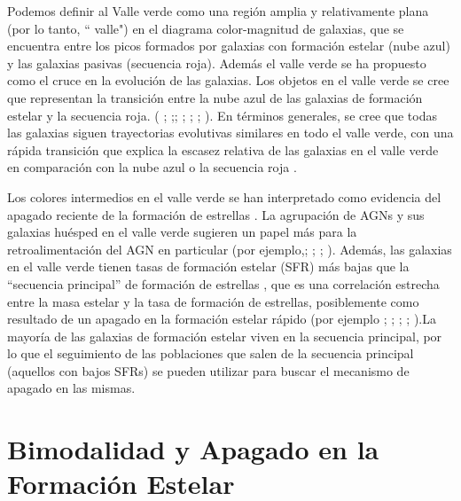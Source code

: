 Podemos definir al Valle verde como una región amplia y relativamente plana
(por lo tanto, `` valle") en el diagrama color-magnitud de galaxias,
que se encuentra entre los picos formados por  galaxias con formación estelar (nube azul)
 y las galaxias pasivas (secuencia roja). Además el valle verde
se ha propuesto  como el cruce en la evolución de las galaxias. Los
objetos en el valle verde se cree que representan la transición entre la nube azul de las galaxias de formación estelar y la
secuencia roja. ( \cite{kauffmann2003};\cite{wyder2007} ;\cite{schiminovich2007}; \cite{martin2007}; \cite{faber2007}; \cite{mendez2011}; \cite{goncalves2012}). En términos generales, se cree que todas las galaxias  siguen
trayectorias evolutivas similares en todo el valle verde, con una
rápida transición que explica la escasez relativa de las galaxias en el
valle verde en comparación con la nube azul o la secuencia roja \citep{haines2015}.

\bigskip

\noindent Los colores intermedios en el valle verde se
han interpretado como evidencia del apagado reciente de la formación de estrellas
\citep{salim2007}. La agrupación de
AGNs y sus galaxias huésped en el valle verde sugieren un papel más
para la retroalimentación del AGN en particular (por ejemplo,\cite{nandra2007}; \cite{hasinger2007}; \cite{silverman2008}; \cite{sanchez2004} ). Además, las galaxias en el valle verde tienen tasas de formación estelar (SFR) más bajas que la ``secuencia principal''
de formación de estrellas \citep{cano2016}, que es una correlación estrecha entre
la masa estelar y la tasa de formación de estrellas, posiblemente como resultado
de un apagado en la formación estelar  rápido (por ejemplo \cite{brinchmann2004}; \cite{elbaz2007};
\cite{salim2007}; \cite{noeske2007}; \cite{peng2010}).La mayoría de las galaxias de formación estelar
viven en la secuencia principal, por lo que el seguimiento de las poblaciones que salen de la
secuencia principal  (aquellos con bajos SFRs) se pueden utilizar para buscar el mecanismo de apagado en las mismas.

\section{Bimodalidad y Apagado en la Formación Estelar}

